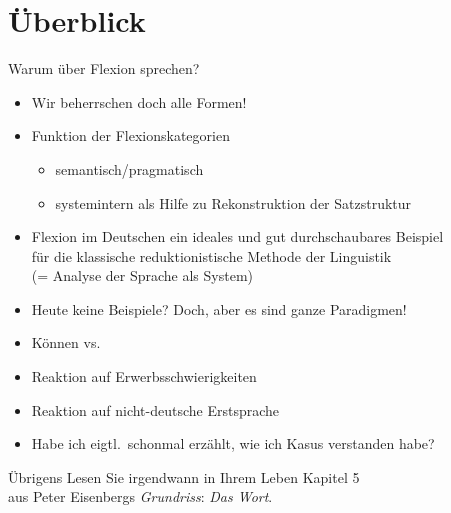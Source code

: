 
\section{Überblick}


\begin{frame}
  {Warum über Flexion sprechen?}
  \pause
  \begin{itemize}[<+->]
    \item \alert{Wir beherrschen doch alle Formen!}
      \Halbzeile
    \item Funktion der Flexionskategorien
      \begin{itemize}
        \item semantisch\slash pragmatisch
        \item \alert{systemintern} als Hilfe zu \alert{Rekonstruktion der Satzstruktur}
      \end{itemize}
      \Halbzeile
    \item Flexion im Deutschen ein ideales und gut durchschaubares Beispiel\\
      für die klassische \alert{reduktionistische} Methode der Linguistik\\
      (= Analyse der Sprache als \alert{System})
      \Halbzeile
    \item Heute keine Beispiele? Doch, aber es sind ganze Paradigmen!
      \Halbzeile
    \item \alert{Können} vs.\ 
    \item Reaktion auf Erwerbsschwierigkeiten
    \item Reaktion auf nicht-deutsche Erstsprache
      \Halbzeile
    \item Habe ich eigtl.\ schonmal erzählt, wie ich Kasus verstanden habe?
  \end{itemize}
\end{frame}

\begin{frame}
  {Übrigens}
  \pause
  \centering
  \Large
  \alert{Lesen Sie irgendwann in Ihrem Leben Kapitel 5\\
    aus Peter Eisenbergs \textit{Grundriss}: \textit{Das Wort}.}\\
    \Halbzeile
    \citep[145--200]{Eisenberg2013a}
\end{frame}

